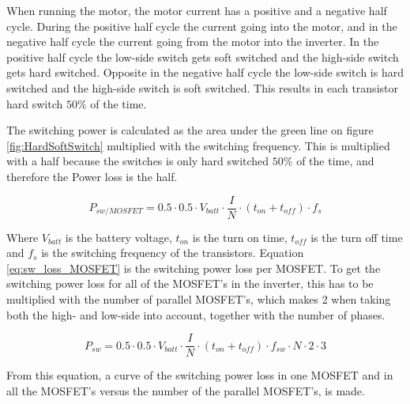 When running the motor, the motor current has a positive and a negative half cycle. During the positive half cycle the current going into the motor, and in the negative half cycle the current going from the motor into the inverter. In the positive half cycle the low-side switch gets soft switched and the high-side switch gets hard switched. Opposite in the negative half cycle the low-side switch is hard switched and the high-side switch is soft switched. This results in each transistor hard switch $50 \%$ of the time.

The switching power is calculated as the area under the green line on figure \ref{fig:HardSoftSwitch} multiplied with the switching frequency. This is multiplied with a half because the switches is only hard switched $50 \%$ of the time, and therefore the Power loss is the half. 

    \begin{equation}
        P_{sw/MOSFET} = 0.5 \cdot 0.5 \cdot V_{batt} \cdot \frac{I}{N} \cdot (t_{on}+t_{off}) \cdot f_{s}
        \label{eq:sw_loss_MOSFET}
    \end{equation}

Where $V_{batt}$ is the battery voltage, $t_{on}$ is the turn on time, $t_{off}$ is the turn off time and $f_{s}$ is the switching frequency of the transistors.
Equation \ref{eq:sw_loss_MOSFET} is the switching power loss per MOSFET. To get the switching power loss for all of the MOSFET's in the inverter, this has to be multiplied with the number of parallel MOSFET's, which makes 2 when taking both the high- and low-side into account, together with the number of phases.

    \begin{equation}
        P_{sw} = 0.5 \cdot 0.5 \cdot V_{batt} \cdot \frac{I}{N} \cdot (t_{on}+t_{off}) \cdot f_{sw} \cdot N \cdot 2 \cdot 3
        \label{eq:sw_loss}
    \end{equation}
    
From this equation, a curve of the switching power loss in one MOSFET and in all the MOSFET's versus the number of the parallel MOSFET's, is made.

